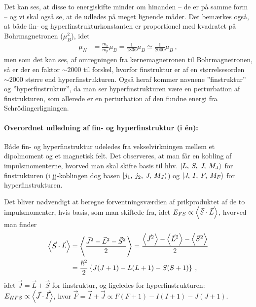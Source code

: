 Det kan ses, at disse to energiskifte minder om hinanden -- de er på samme form -- og vi skal også se, at de udledes på meget lignende måder. Det bemærkes også, at både fin- og hyperfinstrukturkonstanten er proportionel med kvadratet på Bohrmagnetronen ($\mu_B^2$), idet
\begin{align}
    \mu_N &= \frac{m_e}{m_p} \mu_B = \frac{1}{1836}\mu_B \simeq \frac{1}{2000}\mu_B \: ,
\end{align}
men som det kan ses, af omregningen fra kernemagnetronen til Bohrmagnetronen, så er der en faktor $\sim 2000$ til forskel, hvorfor finstruktur er af en størrelsesorden $\sim 2000$ større end hyperfinstrukturen. Også heraf kommer navnene ''finstruktur'' og ''hyperfinstruktur'', da man ser hyperfinstrukturen være en perturbation af finstrukturen, som allerede er en perturbation af den fundne energi fra Schrödingerligningen.\\


\paragraph{Overordnet udledning af fin- og hyperfinstruktur (i én):} Både fin- og hyperfinstruktur udeledes fra vekselvirkningen mellem et dipolmoment og et magnetisk felt. Det observeres, at man får en kobling af impulsmomenterne, hvorved man skal skifte basis til hhv. $\ket{L,\: S,\: J,\: M_J}$ for finstrukturen (i jj-koblingen dog basen $\ket{j_1,\: j_2,\: J,\: M_J}$) og $\ket{J,\: I,\: F,\: M_F}$ for hyperfinstrukturen.

Det bliver nødvendigt at beregne forventningsværdien af prikproduktet af de to impulsmomenter, hvis basis, som man skiftede fra, idet $E_{FS} \propto \Braket{\Vec{S} \cdot \Vec{L}}$, hvorved man finder
\begin{align}
    \Braket{\Vec{S} \cdot \Vec{L}} &= \Braket{\frac{\Vec{J}^2 - \Vec{L}^2 - \Vec{S}^2}{2}}
    = \frac{\Braket{\Vec{J}^2} - \Braket{\Vec{L}^2} - \Braket{\Vec{S}^2}}{2} \nonumber\\
    &= \frac{\hbar^2}{2}\left\{J(J+1) - L(L+1) - S(S+1)\right\} \: ,
\end{align}
idet $\Vec{J} = \Vec{L} + \Vec{S}$ for finstruktur, og ligeledes for hyperfinstrukturen: $E_{HFS} \propto \Braket{\Vec{J} \cdot \Vec{I}}$, hvor $\Vec{F} = \Vec{I} + \Vec{J} \propto F(F+1) - I(I+1) - J(J+1)$.\\


